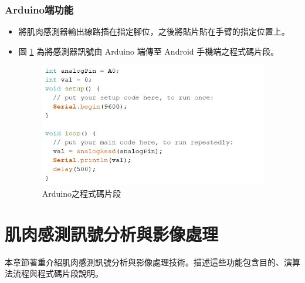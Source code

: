 \documentclass[12pt]{article}  %
\theoremstyle{plain}
\begin{document}
\subsubsection{Arduino端功能}
\begin{itemize}
\item 將肌肉感測器輸出線路插在指定腳位，之後將貼片貼在手臂的指定位置上。
\item 圖 \ref{Arduino之程式碼片段} 為將感測器訊號由 Arduino 端傳至 Android 手機端之程式碼片段。
\begin{figure}[htbp]
\centering
\includegraphics[width=10cm]{pic/ch2/code-Arduino.JPG}
\caption{Arduino之程式碼片段} \label{Arduino之程式碼片段}
\end{figure}
\end{itemize}
\newpage

\section{肌肉感測訊號分析與影像處理}
本章節著重介紹肌肉感測訊號分析與影像處理技術。描述這些功能包含目的、演算法流程與程式碼片段說明。
\end{document}
